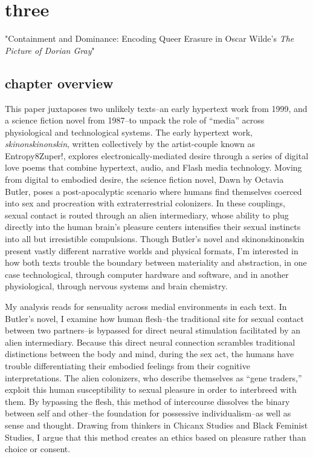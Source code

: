 \documentclass[11pt]{article}
\author{Filipa  Calado}
\date{\today}
\title{}
\begin{document}
\tableofcontents

\section{three}
\label{sec:orga0b4234}

"Containment and Dominance: Encoding Queer Erasure in Oscar Wilde's
\emph{The Picture of Dorian Gray}"

\subsection{chapter overview}
\label{sec:org5ffada5}
This paper juxtaposes two unlikely texts--an early hypertext work from
1999, and a science fiction novel from 1987--to unpack the role of
“media” across physiological and technological systems. The early
hypertext work, \emph{skinonskinonskin}, written collectively by the
artist-couple known as Entropy8Zuper!, explores
electronically-mediated desire through a series of digital love poems
that combine hypertext, audio, and Flash media technology. Moving from
digital to embodied desire, the science fiction novel, Dawn by Octavia
Butler, poses a post-apocalyptic scenario where humans find themselves
coerced into sex and procreation with extraterrestrial colonizers. In
these couplings, sexual contact is routed through an alien
intermediary, whose ability to plug directly into the human brain’s
pleasure centers intensifies their sexual instincts into all but
irresistible compulsions. Though Butler’s novel and skinonskinonskin
present vastly different narrative worlds and physical formats, I’m
interested in how both texts trouble the boundary between materiality
and abstraction, in one case technological, through computer hardware
and software, and in another physiological, through nervous systems
and brain chemistry.

My analysis reads for sensuality across medial environments in each
text. In Butler’s novel, I examine how human flesh--the traditional
site for sexual contact between two partners--is bypassed for direct
neural stimulation facilitated by an alien intermediary. Because this
direct neural connection scrambles traditional distinctions between
the body and mind, during the sex act, the humans have trouble
differentiating their embodied feelings from their cognitive
interpretations. The alien colonizers, who describe themselves as
“gene traders,” exploit this human susceptibility to sexual pleasure
in order to interbreed with them. By bypassing the flesh, this method
of intercourse dissolves the binary between self and other--the
foundation for possessive individualism--as well as sense and
thought. Drawing from thinkers in Chicanx Studies and Black Feminist
Studies, I argue that this method creates an ethics based on pleasure
rather than choice or consent.
\end{document}
